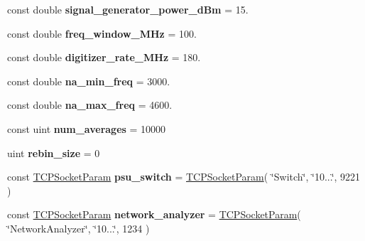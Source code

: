 \begin{DoxyCompactItemize}
\item 
const double {\bfseries signal\+\_\+generator\+\_\+power\+\_\+d\+Bm} = 15.\hypertarget{classetig_1_1_program_core_ae75519ef4954fa2c1574428743e28143}{}\label{classetig_1_1_program_core_ae75519ef4954fa2c1574428743e28143}

\item 
const double {\bfseries freq\+\_\+window\+\_\+\+M\+Hz} = 100.\hypertarget{classetig_1_1_program_core_a6f2bb8b5e0302f06768cf0dcc4ec144b}{}\label{classetig_1_1_program_core_a6f2bb8b5e0302f06768cf0dcc4ec144b}

\item 
const double {\bfseries digitizer\+\_\+rate\+\_\+\+M\+Hz} = 180.\hypertarget{classetig_1_1_program_core_aa7f5ff1910379a1a8289b7bf90a9d67e}{}\label{classetig_1_1_program_core_aa7f5ff1910379a1a8289b7bf90a9d67e}

\item 
const double {\bfseries na\+\_\+min\+\_\+freq} = 3000.\hypertarget{classetig_1_1_program_core_a67d8315993116e9e18d86b81b4a13cf8}{}\label{classetig_1_1_program_core_a67d8315993116e9e18d86b81b4a13cf8}

\item 
const double {\bfseries na\+\_\+max\+\_\+freq} = 4600.\hypertarget{classetig_1_1_program_core_a233d0a5af3b5a9855497e856c8728fac}{}\label{classetig_1_1_program_core_a233d0a5af3b5a9855497e856c8728fac}

\item 
const uint {\bfseries num\+\_\+averages} = 10000\hypertarget{classetig_1_1_program_core_a45e70a7c9fda697e2e9882614647a67e}{}\label{classetig_1_1_program_core_a45e70a7c9fda697e2e9882614647a67e}

\item 
uint {\bfseries rebin\+\_\+size} = 0\hypertarget{classetig_1_1_program_core_aa451c512891ac93ba9f07ed4474e558f}{}\label{classetig_1_1_program_core_aa451c512891ac93ba9f07ed4474e558f}

\item 
const \hyperlink{struct_t_c_p_socket_param}{T\+C\+P\+Socket\+Param} {\bfseries psu\+\_\+switch} = \hyperlink{struct_t_c_p_socket_param}{T\+C\+P\+Socket\+Param}( \char`\"{}Switch\char`\"{}, \char`\"{}10...\char`\"{}, 9221 )\hypertarget{classetig_1_1_program_core_a0e2454403a85b97801f772e720b01631}{}\label{classetig_1_1_program_core_a0e2454403a85b97801f772e720b01631}

\item 
const \hyperlink{struct_t_c_p_socket_param}{T\+C\+P\+Socket\+Param} {\bfseries network\+\_\+analyzer} = \hyperlink{struct_t_c_p_socket_param}{T\+C\+P\+Socket\+Param}( \char`\"{}Network\+Analyzer\char`\"{}, \char`\"{}10...\char`\"{}, 1234 )\hypertarget{classetig_1_1_program_core_ab730e120b7ea8d72101d4002d816e8ec}{}\label{classetig_1_1_program_core_ab730e120b7ea8d72101d4002d816e8ec}


\end{DoxyCompactItemize}
